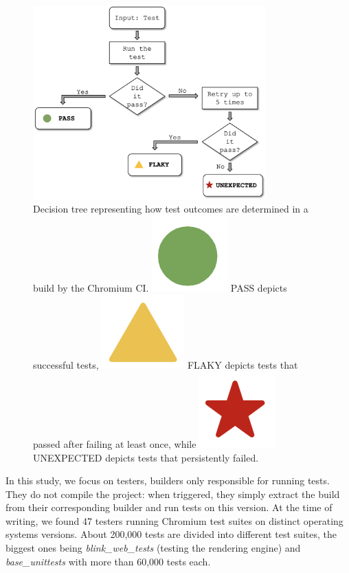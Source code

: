 \begin{figure}[ht]
\centering
\includegraphics[width=0.8\textwidth]{figures/chromium/gui_process_final.png}
\caption{Decision tree representing how test outcomes are determined in a build by the Chromium CI. \includegraphics[scale=0.2]{figures/chromium/pass.png} PASS depicts successful tests, \includegraphics[scale=0.2]{figures/chromium/flaky.png} FLAKY depicts tests that passed after failing at least once, while \includegraphics[scale=0.2]{figures/chromium/fail.png} UNEXPECTED depicts tests that persistently failed.}
\label{fig:decision-tree}
\end{figure}

In this study, we focus on testers, \ie builders only responsible for running tests. They do not compile the project: when triggered, they simply extract the build from their corresponding builder and run tests on this version. At the time of writing, we found 47 testers running Chromium test suites on distinct operating systems versions. About 200,000 tests are divided into different test suites, the biggest ones being \textit{blink\_web\_tests} (testing the rendering engine) and \textit{base\_unittests} with more than 60,000 tests each.

